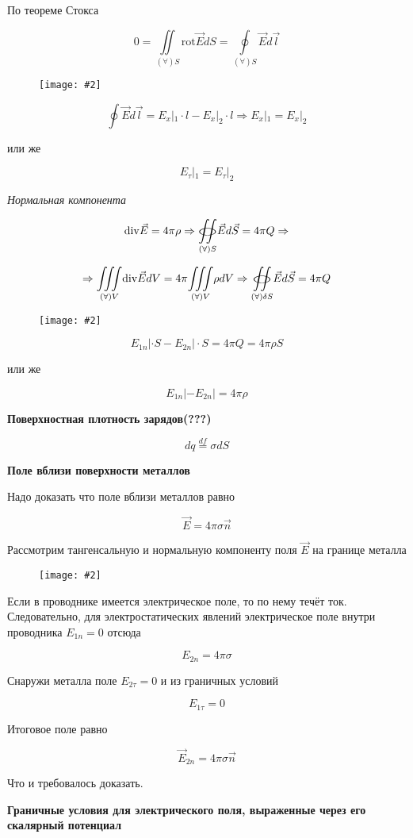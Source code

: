 \documentclass[a4paper,12pt]{article}
\newcommand{\tc}[1]{
    \vspace{0.5em}
    \noindent\textbf{\large #1}
    \vspace{0.3em}
}
\newcommand{\kr}[1]{\textit{#1}}
\newcommand{\fc}[1]{\[#1\]}
\newcommand{\mdd}[1]{$#1$}
\newcommand{\mm}[1]{\mathrm{#1}}
\newcommand{\oiint}{%
  \mathchoice%
    {\mathop{\raisebox{0.1ex}{\scalebox{1.7}[0.7]{\(\bigcirc\)}}}%
     \!\!\!\!\!\!\!\!\!\!\!\int\!\!\!\int}%
    {\mathop{\raisebox{0.2ex}{\scalebox{1.}[0.6]{\(\bigcirc\)}}}%
     \!\!\!\!\!\!\!\int\!\!\!\int}%
    {\mathop{\raisebox{0.1ex}{\scalebox{1}[0.8]{\(\bigcirc\)}}}%
     \!\!\!\!\!\!\!\!\!\int\!\!\!\int}%
    {\mathop{\raisebox{0.05ex}{\scalebox{0.8}[0.8]{\(\bigcirc\)}}}%
     \!\!\!\!\!\!\!\!\int\!\!\!\int}%
}
\newcommand{\imc}[2][0.7\textwidth]{%
    \begin{figure}[h!]
        \centering
        \texttt{[image: \#2]}
    \end{figure}%
}
\begin{document}
По теореме Стокса

\fc{0=\underset{(\forall )S}{\iint} \mm{rot}\vec{E}dS=\underset{(\forall )S}{\oint }\vec{E}d\vec{l}}

\imc[1.\textwidth]{10.png} 

\newpage


\fc{\oint \vec{E}d\vec{l}=E_x|_1\cdot l-E_x|_2\cdot l\Rightarrow E_x|_1=E_x|_2}

или же 

\fc{E_\tau|_1=E_\tau|_2}

\kr{Нормальная компонента}

\fc{\mm{div}\vec{E}=4\pi \rho \Rightarrow \underset{(\forall)S}{\oiint}\vec{E}d\vec{S}=4\pi Q \Rightarrow}

\fc{\Rightarrow \underset{(\forall)V}{\iiint} \mm{div}\vec{E}dV=4\pi \underset{(\forall)V}{\iiint} \rho dV \Rightarrow \underset{(\forall)\delta S}{\oiint}\vec{E}d\vec{S}=4\pi Q }

\imc[0.7\textwidth]{11.png}

\fc{E_{1n}|\cdot S-E_{2n}|\cdot S=4\pi Q=4\pi \rho S}

или же 

\fc{E_{1n}| -E_{2n}| =4\pi \rho }

\tc{Поверхностная плотность зарядов(???)}

\fc{dq\overset{df}{=}\sigma dS}

\newpage


\tc{Поле вблизи поверхности металлов}

Надо доказать что поле вблизи металлов равно

\fc{\vec{E}=4\pi \sigma \vec{n}}

Рассмотрим тангенсальную и нормальную компоненту поля \mdd{\vec{E}} на границе металла
 
\imc[0.7\textwidth]{12.png}

Если в проводнике имеется электрическое поле, то по нему течёт ток. Следовательно, для электростатических явлений электрическое поле внутри проводника \mdd{E_{1n}=0} отсюда 

\fc{E_{2n}=4\pi \sigma}

Снаружи металла поле \mdd{E_{2\tau }=0} и из граничных условий  

\fc{E_{1\tau}=0}

Итоговое поле равно 

\fc{\vec{E}_{2n}=4\pi \sigma \vec{n}}

Что и требовалось доказать.

\newpage


\tc{Граничные условия для электрического поля,
выраженные через его скалярный потенциал}
\end{document}
